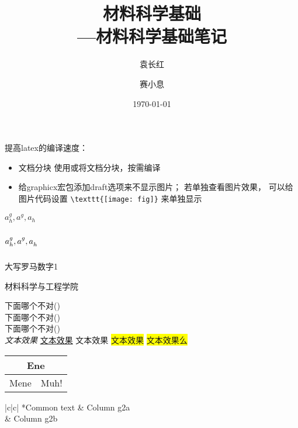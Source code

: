 \documentclass{article}
\newcommand{\red}[1]{\textcolor[rgb]{1.00,0.00,0.00}{#1}}
\begin{document}
\author{袁长红 \and 赛小息}
\title{材料科学基础\\---材料科学基础笔记}
\date{\today}
\maketitle


\pagestyle{fancy}
\rhead{}
\lhead{}
\lfoot{}
\cfoot{\thepage}
\rfoot{}
\renewcommand{\headrulewidth}{0.4pt}
\renewcommand{\footrulewidth}{0.4pt}

\renewcommand{\contentsname}{目录}%
\def\abstractname{简述}
\newtheorem{law}{定理}
\newtheorem{definition}{定义}
\newtheorem{test}{test}
\tableofcontents
提高latex的编译速度：
\begin{itemize}
	\item 文档分块 使用\verb--或\verb--将文档分块，按需编译
 	\item 给graphicx宏包添加draft选项来不显示图片；
	 若单独查看图片效果，
	 可以给图片代码设置
	 \verb-\texttt{[image: fig]}-
	 来单独显示
\end{itemize}

$a_h^g, a^g, a_h$

$a_h^g, a_{\vphantom{\strut}}^g, a^{\vphantom{\strut}}_h$


大写罗马数字1\uppercase\expandafter{}

材料科学与工程学院\linebreak

下面哪个不对\hfill (\quad)\\
下面哪个不对\dotfill (\quad)\\
下面哪个不对\hrulefill (\quad)\\

{\em 文本效果}
	\underline{文本效果}
	\red{文本效果}
	\colorbox{yellow}{文本效果}
	\colorbox{yellow}{\red{文本效果么}}

\newpage
\centering\begin{tabular}{|c|c|}
\hline
\multicolumn{2}{|c|}{Ene}\\%
\hline
Mene & Muh! \\
\hline
\end{tabular}

\begin{tabular}{|c|c|}\hline
{}*{Common text}%
& Column g2a \\ 
& Column g2b \\ \hline
\end{tabular}
\end{document}
